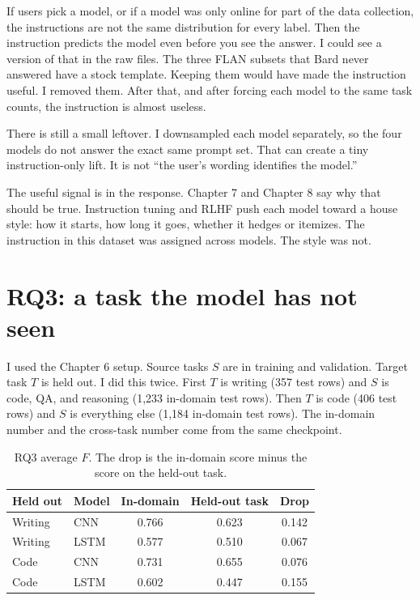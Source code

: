 \documentclass[11pt]{article}
\begin{document}
If users pick a model, or if a model was only online for part of the data collection, the instructions are not the same distribution for every label. Then the instruction predicts the model even before you see the answer. I could see a version of that in the raw files. The three FLAN subsets that Bard never answered have a stock template. Keeping them would have made the instruction useful. I removed them. After that, and after forcing each model to the same task counts, the instruction is almost useless.

There is still a small leftover. I downsampled each model separately, so the four models do not answer the exact same prompt set. That can create a tiny instruction-only lift. It is not ``the user's wording identifies the model.''

The useful signal is in the response. Chapter 7 and Chapter 8 say why that should be true. Instruction tuning and RLHF push each model toward a house style: how it starts, how long it goes, whether it hedges or itemizes. The instruction in this dataset was assigned across models. The style was not.

\section{RQ3: a task the model has not seen}
\label{sec:rq3}

I used the Chapter 6 setup. Source tasks $S$ are in training and validation. Target task $T$ is held out. I did this twice. First $T$ is writing (357 test rows) and $S$ is code, QA, and reasoning (1,233 in-domain test rows). Then $T$ is code (406 test rows) and $S$ is everything else (1,184 in-domain test rows). The in-domain number and the cross-task number come from the same checkpoint.

\begin{table}[H]
\centering
\caption{RQ3 average $F$. The drop is the in-domain score minus the score on the held-out task.}
\label{tab:rq3}
\begin{tabular}{llccc}
\toprule
Held out & Model & In-domain & Held-out task & Drop \\
\midrule
Writing & CNN & 0.766 & 0.623 & 0.142 \\
Writing & LSTM & 0.577 & 0.510 & 0.067 \\
Code & CNN & 0.731 & 0.655 & 0.076 \\
Code & LSTM & 0.602 & 0.447 & 0.155 \\
\bottomrule
\end{tabular}
\end{table}
\end{document}
